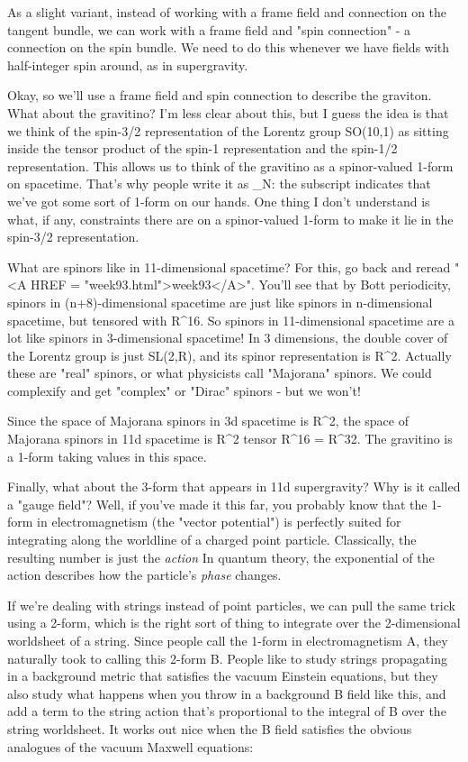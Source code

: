 As a slight variant, instead of working with a frame field and 
connection on the tangent bundle, we can work with a frame field and 
"spin connection" - a connection on the spin bundle.  We need to do this 
whenever we have fields with half-integer spin around, as in supergravity.    
 
Okay, so we'll use a frame field and spin connection to describe the
graviton.  What about the gravitino?  I'm less clear about this, but I
guess the idea is that we think of the spin-3/2 representation of the
Lorentz group SO(10,1) as sitting inside the tensor product of the
spin-1 representation and the spin-1/2 representation.  This allows us
to think of the gravitino as a spinor-valued 1-form on spacetime.
That's why people write it as \psi _{N}: 
the subscript indicates that we've
got some sort of 1-form on our hands.  One thing I don't understand is
what, if any, constraints there are on a spinor-valued 1-form to make
it lie in the spin-3/2 representation.
  
What are spinors like in 11-dimensional spacetime?  For this, go back
and reread "<A HREF = "week93.html">week93</A>".  You'll see
that by Bott periodicity, spinors in (n+8)-dimensional spacetime are
just like spinors in n-dimensional spacetime, but tensored with
R^{16}.  So spinors in 11-dimensional spacetime are a lot like
spinors in 3-dimensional spacetime!  In 3 dimensions, the double cover
of the Lorentz group is just SL(2,R), and its spinor representation is
R^{2}.  Actually these are "real" spinors, or what
physicists call "Majorana" spinors.  We could complexify and
get "complex" or "Dirac" spinors - but we won't!
 
Since the space of Majorana spinors in 3d spacetime is R^{2},
the space of Majorana spinors in 11d spacetime is R^{2} tensor
R^{16} = R^{32}.  The gravitino is a 1-form taking
values in this space.
 
Finally, what about the 3-form that appears in 11d supergravity?  Why is
it called a "gauge field"?  Well, if you've made it this far,
you probably know that the 1-form in electromagnetism (the "vector
potential") is perfectly suited for integrating along the worldline
of a charged point particle.  Classically, the resulting number is just
the \emph{action}  In quantum theory, the exponential of the action describes
how the particle's \emph{phase} changes.
 
If we're dealing with strings instead of point particles, we can pull
the same trick using a 2-form, which is the right sort of thing to
integrate over the 2-dimensional worldsheet of a string.  Since people
call the 1-form in electromagnetism A, they naturally took to calling
this 2-form B.  People like to study strings propagating in a background
metric that satisfies the vacuum Einstein equations, but they also study
what happens when you throw in a background B field like this, and add a
term to the string action that's proportional to the integral of B over
the string worldsheet.  It works out nice when the B field satisfies the
obvious analogues of the vacuum Maxwell equations:
 

